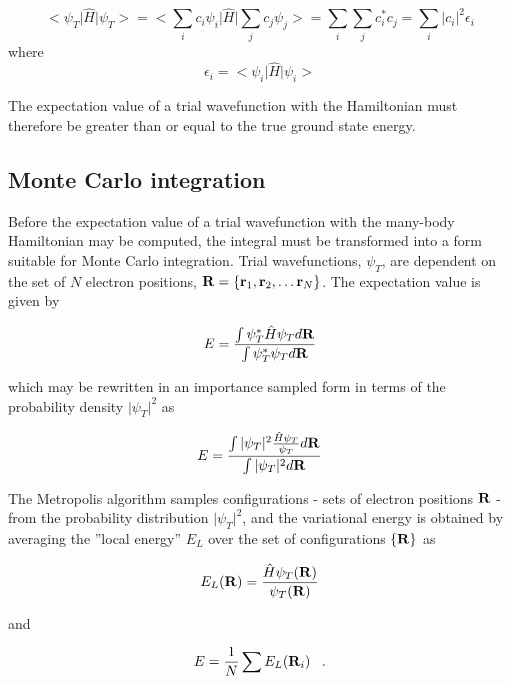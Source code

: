 \documentclass{article}
\begin{document}
\begin{equation}
 <\psi_T\vert\hat{H}\vert\psi_T > = <\sum_i c_i\psi_i\vert\hat{H}\vert\sum_j c_j\psi_j >
 = \sum_i \sum_j c_{i}^{*} c_{j}
 = \sum_i \vert c_{i}\vert^{2} \epsilon_{i}
\end{equation}
where 
\begin{equation}
 \epsilon_{i} = <\psi_i\vert\hat{H}\vert\psi_i >
\end{equation}

The expectation value of a trial wavefunction with the Hamiltonian must therefore be greater than or equal to the true ground state energy.

\subsection{Monte Carlo integration}
Before the expectation value of a trial wavefunction with the many-body Hamiltonian may be computed, the integral must be transformed into a form suitable for Monte Carlo integration. Trial wavefunctions, $\psi_T$, are dependent on the set of $N$ electron positions,  ${\bf R}=\{{\bf r}_1,{\bf r}_2, \ldots {\bf r}_N\}$. The expectation value is given by

\begin{equation}
E=\frac{\int \psi_{T}^{*}\hat{H}\psi_{T} d{\bf R}}
{\int \psi_{T}^{*}\psi_{T}d{\bf R}}
\end{equation}

which may be rewritten in an importance sampled form in terms of the probability density  $\vert\psi_{T}\vert^{2}$ as

\begin{equation}
E=\frac{\int \vert\psi_{T}\vert^{2}\frac{\hat{H}\psi_{T}}{\psi_{T}} d{\bf R}}
{\int \vert\psi_{T}\vert^{2}d{\bf R}}
\end{equation}

The Metropolis algorithm samples configurations - sets of electron positions ${\bf R}$ - from the probability distribution  $\vert\psi_{T}\vert^{2}$, and the variational energy is obtained by averaging the ''local energy'' $E_{L}$ over the set of configurations $\{{\bf R}\}$ as 

\begin{equation}
\label{E_local}
E_{L}({\bf R})=\frac{\hat{H}\psi_{T}({\bf R})}{\psi_{T}({\bf R})}
\end{equation}

and 

\begin{equation}
E=\frac{1}{N} \sum E_{L}({\bf R}_i) \;\;\;.
\end{equation}
\end{document}
